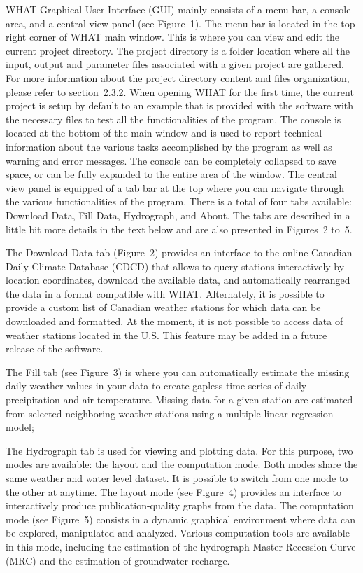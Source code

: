 \documentclass[12pt, letterpaper, fleqn]{report}
\begin{document}
WHAT Graphical User Interface (GUI) mainly consists of a menu bar, a console area, and a central view panel (see Figure 1). The menu bar is located in the top right corner of WHAT main window. This is where you can view and edit the current project directory. The project directory is a folder location where all the input, output and parameter files associated with a given project are gathered. For more information about the project directory content and files organization, please refer to section 2.3.2. When opening WHAT for the first time, the current project is setup by default to an example that is provided with the software with the necessary files to test all the functionalities of the program. The console is located at the bottom of the main window and is used to report technical information about the various tasks accomplished by the program as well as warning and error messages. The console can be completely collapsed to save space, or can be fully expanded to the entire area of the window. The central view panel is equipped of a tab bar at the top where you can navigate through the various functionalities of the program. There is a total of four tabs available: Download Data, Fill Data, Hydrograph, and About. The tabs are described in a little bit more details in the text below and are also presented in Figures 2 to 5.

The Download Data tab (Figure 2) provides an interface to the online Canadian Daily Climate Database (CDCD) that allows to query stations interactively by location coordinates, download the available data, and automatically rearranged the data in a format compatible with WHAT. Alternately, it is possible to provide a custom list of Canadian weather stations for which data can be downloaded and formatted. At the moment, it is not possible to access data of weather stations located in the U.S. This feature may be added in a future release of the software.

The Fill tab (see Figure 3) is where you can automatically estimate the missing daily weather values in your data to create gapless time-series of daily precipitation and air temperature. Missing data for a given station are estimated from selected neighboring weather stations using a multiple linear regression model;

The Hydrograph tab is used for viewing and plotting data. For this purpose, two modes are available: the layout and the computation mode. Both modes share the same weather and water level dataset. It is possible to switch from one mode to the other at anytime. The layout mode (see Figure 4) provides an interface to interactively produce publication-quality graphs from the data. The computation mode (see Figure 5) consists in a dynamic graphical environment where data can be explored, manipulated and analyzed. Various computation tools are available in this mode, including the estimation of the hydrograph Master Recession Curve (MRC) and the estimation of groundwater recharge.
\end{document}
